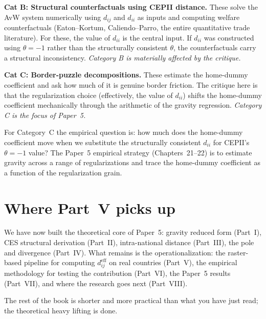 \documentclass[11pt,letterpaper,oneside]{book}
\theoremstyle{definition}
\theoremstyle{remark}
\newcommand{\eff}{\mathrm{eff}}
\begin{document}
\textbf{Cat B: Structural counterfactuals using CEPII distance.} These solve the AvW system numerically using $d_{ij}$ and $d_{ii}$ as inputs and computing welfare counterfactuals (Eaton--Kortum, Caliendo--Parro, the entire quantitative trade literature). For these, the value of $d_{ii}$ is the central input. If $d_{ii}$ was constructed using $\theta = -1$ rather than the structurally consistent $\theta$, the counterfactuals carry a structural inconsistency. \emph{Category B is materially affected by the critique.}

\textbf{Cat C: Border-puzzle decompositions.} These estimate the home-dummy coefficient and ask how much of it is genuine border friction. The critique here is that the regularization choice (effectively, the value of $d_{ii}$) shifts the home-dummy coefficient mechanically through the arithmetic of the gravity regression. \emph{Category C is the focus of Paper~5.}

For Category~C the empirical question is: how much does the home-dummy coefficient move when we substitute the structurally consistent $d_{ii}$ for CEPII's $\theta = -1$ value? The Paper~5 empirical strategy (Chapters~21--22) is to estimate gravity across a range of regularizations and trace the home-dummy coefficient as a function of the regularization grain.

\section{Where Part~V picks up}

We have now built the theoretical core of Paper~5: gravity reduced form (Part~I), CES structural derivation (Part~II), intra-national distance (Part~III), the pole and divergence (Part~IV). What remains is the operationalization: the raster-based pipeline for computing $d_{ij}^{\eff}$ on real countries (Part~V), the empirical methodology for testing the contribution (Part~VI), the Paper~5 results (Part~VII), and where the research goes next (Part~VIII).

The rest of the book is shorter and more practical than what you have just read; the theoretical heavy lifting is done.


\backmatter

\appendix
\end{document}
